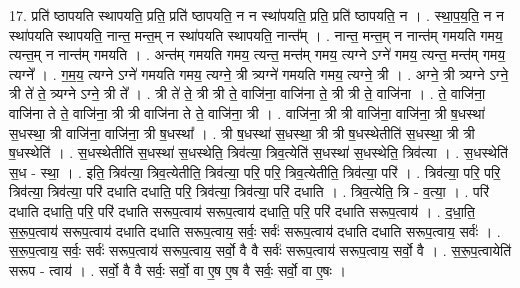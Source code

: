 \documentclass[17pt]{extarticle}
\begin{document}
17. प्रति॑ ष्ठापयति स्थापयति॒ प्रति॒ प्रति॑ ष्ठापयति॒ न न स्था॑पयति॒ प्रति॒ प्रति॑ ष्ठापयति॒ न । . स्था॒प॒य॒ति॒ न न स्था॑पयति स्थापयति॒ नान्त॒ मन्त॒म् न स्था॑पयति स्थापयति॒ नान्त᳚म् । . नान्त॒ मन्त॒म् न नान्त॑म् गमयति गमय॒ त्यन्त॒म् न नान्त॑म् गमयति । . अन्त॑म् गमयति गमय॒ त्यन्त॒ मन्त॑म् गमय॒ त्यग्ने ऽग्ने॑ गमय॒ त्यन्त॒ मन्त॑म् गमय॒ त्यग्ने᳚ । . ग॒म॒य॒ त्यग्ने ऽग्ने॑ गमयति गमय॒ त्यग्ने॒ त्री त्र्यग्ने॑ गमयति गमय॒ त्यग्ने॒ त्री । . अग्ने॒ त्री त्र्यग्ने ऽग्ने॒ त्री ते॑ ते॒ त्र्यग्ने ऽग्ने॒ त्री ते᳚ । . त्री ते॑ ते॒ त्री त्री ते॒ वाजि॑ना॒ वाजि॑ना ते॒ त्री त्री ते॒ वाजि॑ना । . ते॒ वाजि॑ना॒ वाजि॑ना ते ते॒ वाजि॑ना॒ त्री त्री वाजि॑ना ते ते॒ वाजि॑ना॒ त्री । . वाजि॑ना॒ त्री त्री वाजि॑ना॒ वाजि॑ना॒ त्री ष॒धस्था॑ स॒धस्था॒ त्री वाजि॑ना॒ वाजि॑ना॒ त्री ष॒धस्था᳚ । . त्री ष॒धस्था॑ स॒धस्था॒ त्री त्री ष॒धस्थेतीति॑ स॒धस्था॒ त्री त्री ष॒धस्थेति॑ । . स॒धस्थेतीति॑ स॒धस्था॑ स॒धस्थेति॒ त्रिव॑त्या॒ त्रिव॒त्येति॑ स॒धस्था॑ स॒धस्थेति॒ त्रिव॑त्या । . स॒धस्थेति॑ स॒ध - स्था॒ । . इति॒ त्रिव॑त्या॒ त्रिव॒त्येतीति॒ त्रिव॑त्या॒ परि॒ परि॒ त्रिव॒त्येतीति॒ त्रिव॑त्या॒ परि॑ । . त्रिव॑त्या॒ परि॒ परि॒ त्रिव॑त्या॒ त्रिव॑त्या॒ परि॑ दधाति दधाति॒ परि॒ त्रिव॑त्या॒ त्रिव॑त्या॒ परि॑ दधाति । . त्रिव॒त्येति॒ त्रि - व॒त्या॒ । . परि॑ दधाति दधाति॒ परि॒ परि॑ दधाति सरूप॒त्वाय॑ सरूप॒त्वाय॑ दधाति॒ परि॒ परि॑ दधाति सरूप॒त्वाय॑ । . द॒धा॒ति॒ स॒रू॒प॒त्वाय॑ सरूप॒त्वाय॑ दधाति दधाति सरूप॒त्वाय॒ सर्वः॒ सर्वः॑ सरूप॒त्वाय॑ दधाति दधाति सरूप॒त्वाय॒ सर्वः॑ । . स॒रू॒प॒त्वाय॒ सर्वः॒ सर्वः॑ सरूप॒त्वाय॑ सरूप॒त्वाय॒ सर्वो॒ वै वै सर्वः॑ सरूप॒त्वाय॑ सरूप॒त्वाय॒ सर्वो॒ वै । . स॒रू॒प॒त्वायेति॑ सरूप - त्वाय॑ । . सर्वो॒ वै वै सर्वः॒ सर्वो॒ वा ए॒ष ए॒ष वै सर्वः॒ सर्वो॒ वा ए॒षः । \newline
\end{document}
